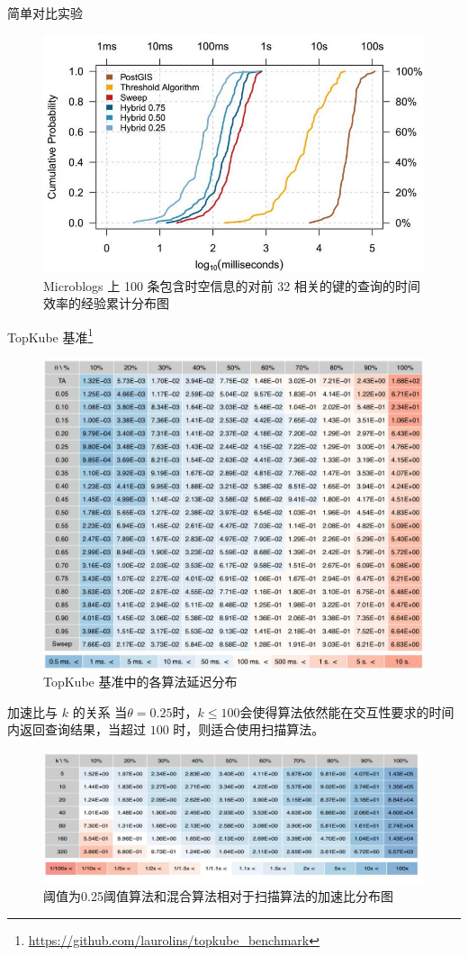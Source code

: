\documentclass[10pt,aspectratio=169]{ctexbeamer}
\begin{document}
\begin{frame}{简单对比实验}
    \begin{figure}
        \includegraphics[width=.5\textwidth]{pic/blog.jpg}
        \caption{Microblogs 上 100 条包含时空信息的对前 32 相关的键的查询的时间效率的经验累计分布图}
    \end{figure}
\end{frame}

\begin{frame}{TopKube 基准\footnote{\url{https://github.com/laurolins/topkube_benchmark}}}
    \begin{figure}
        \includegraphics[width=.4\textwidth]{pic/time-peformance.jpg}
        \caption{TopKube 基准中的各算法延迟分布}
    \end{figure}
\end{frame}

\begin{frame}{加速比与 $k$ 的关系}
    当$\theta = 0.25$时，$k \leq 100$会使得算法依然能在交互性要求的时间内返回查询结果，当超过 $100$ 时，则适合使用扫描算法。

    \begin{figure}
        \includegraphics[width=.5\textwidth]{pic/speedup-to-sweep.png}
        \caption{阈值为0.25阈值算法和混合算法相对于扫描算法的加速比分布图}
    \end{figure}

\end{frame}
\end{document}
